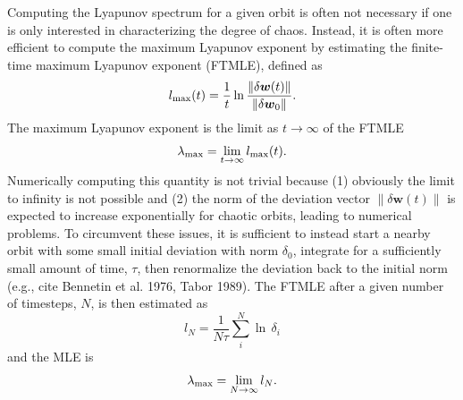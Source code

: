 \documentclass[letterpaper,12pt,preprint]{aastex}
\newcommand{\bs}[1]{\boldsymbol{#1}}
\begin{document}
Computing the Lyapunov spectrum for a given orbit is often not necessary if one is only interested in characterizing the degree of chaos. Instead, it is often more efficient to compute the maximum Lyapunov exponent by estimating the finite-time maximum Lyapunov exponent (FTMLE), defined as 
\begin{equation}
	l_{\rm max}(t) = \frac{1}{t}\ln \frac{\|\delta \bs{w}(t)\|}{\|\delta \bs{w}_0\|}.\label{eq:lmax}
\end{equation}
The maximum Lyapunov exponent is the limit as $t\rightarrow \infty$ of the FTMLE
\begin{equation}
	\lambda_{\rm max} = \lim_{t\rightarrow\infty}l_{\rm max}(t). \label{eq:lyapmax}
\end{equation}
Numerically computing this quantity is not trivial because (1) obviously the limit to infinity is not possible and (2) the norm of the deviation vector $\|\delta \bs{w}(t)\|$ is expected to increase exponentially for chaotic orbits, leading to numerical problems. To circumvent these issues, it is sufficient to instead start a nearby orbit with some small initial deviation with norm $\delta_0$, integrate for a sufficiently small amount of time, $\tau$, then renormalize the deviation back to the initial norm (e.g., cite Bennetin et al. 1976, Tabor 1989). 
The FTMLE after a given number of timesteps, $N$, is then estimated as
\begin{equation}
	l_N = \frac{1}{N\tau}\sum_i^N \ln \, \delta_i
\end{equation}
and the MLE is
\begin{equation}
	\lambda_{\rm max} = \lim_{N\rightarrow \infty} l_N.
\end{equation}
\end{document}
